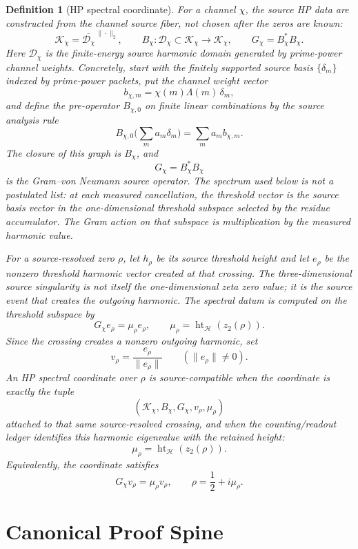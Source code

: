 \documentclass[11pt]{article}
\newtheorem{definition}{Definition}[section]
\DeclareMathOperator{\hgt}{ht}
\begin{document}
\begin{definition}[HP spectral coordinate]
For a channel $\chi$, the source HP data are constructed from the channel source
fiber, not chosen after the zeros are known:
\[
  \mathcal K_\chi=\overline{\mathcal D_\chi}^{\,\|\cdot\|_2},\qquad
  B_\chi:\mathcal D_\chi\subset\mathcal K_\chi\longrightarrow\mathcal K_\chi,
  \qquad
  G_\chi=B_\chi^*B_\chi .
\]
Here $\mathcal D_\chi$ is the finite-energy source harmonic domain generated by
prime-power channel weights.  Concretely, start with the finitely supported
source basis $\{\delta_m\}$ indexed by prime-power packets, put the channel
weight vector
\[
  b_{\chi,m}=\chi(m)\Lambda(m)\,\delta_m,
\]
and define the pre-operator $B_{\chi,0}$ on finite linear combinations by the
source analysis rule
\[
  B_{\chi,0}\Big(\sum_m a_m\delta_m\Big)=\sum_m a_m b_{\chi,m} .
\]
The closure of this graph is $B_\chi$, and
\[
  G_\chi=B_\chi^*B_\chi
\]
is the Gram--von Neumann source operator.  The spectrum used below is not a
postulated list: at each measured cancellation, the threshold vector is the
source basis vector in the one-dimensional threshold subspace selected by the
residue accumulator.  The Gram action on that subspace is multiplication by the
measured harmonic value.

For a source-resolved zero $\rho$, let $h_\rho$ be its source threshold height
and let $e_\rho$ be the nonzero threshold harmonic vector created at that
crossing.  The three-dimensional source singularity is not itself the
one-dimensional zeta zero value; it is the source event that creates the
outgoing harmonic.  The spectral datum is computed on the threshold subspace by
\[
  G_\chi e_\rho=\mu_\rho e_\rho,
  \qquad
  \mu_\rho=\hgt_{\mathcal H}(z_2(\rho)).
\]
Since the crossing creates a nonzero outgoing harmonic, set
\[
  v_\rho=\frac{e_\rho}{\|e_\rho\|}
  \qquad(\|e_\rho\|\ne0).
\]
An HP spectral coordinate over $\rho$ is source-compatible when the coordinate
is exactly the tuple
\[
  (\mathcal K_\chi,B_\chi,G_\chi,v_\rho,\mu_\rho)
\]
attached to that same source-resolved crossing, and when the counting/readout
ledger identifies this harmonic eigenvalue with the retained height:
\[
  \mu_\rho=\hgt_{\mathcal H}(z_2(\rho)).
\]
Equivalently, the coordinate satisfies
\[
  G_\chi v_\rho=\mu_\rho v_\rho,
  \qquad
  \rho=\frac12+i\mu_\rho .
\]
\end{definition}

\section{Canonical Proof Spine}
\end{document}
